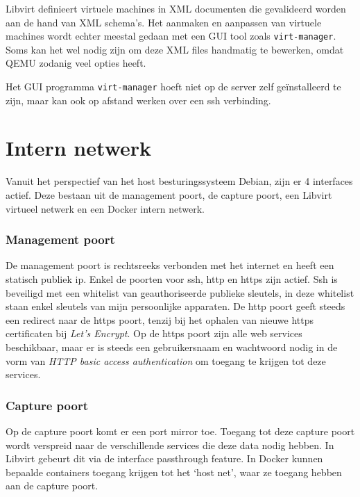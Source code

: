 \documentclass[a4paper,12pt]{report}
\begin{document}
Libvirt definieert virtuele machines in XML documenten die gevalideerd worden aan de hand van XML schema's.
Het aanmaken en aanpassen van virtuele machines wordt echter meestal gedaan met een GUI tool zoals \lstinline|virt-manager|.
Soms kan het wel nodig zijn om deze XML files handmatig te bewerken, omdat QEMU zodanig veel opties heeft.
\autocite{libvirt:docs}

Het GUI programma \lstinline|virt-manager| hoeft niet op de server zelf geïnstalleerd te zijn, maar kan ook op afstand werken over een ssh verbinding.


\section{Intern netwerk}
Vanuit het perspectief van het host besturingssysteem Debian, zijn er 4 interfaces actief.
Deze bestaan uit de management poort, de capture poort, een Libvirt virtueel netwerk en een Docker intern netwerk.

\subsubsection{Management poort}
De management poort is rechtsreeks verbonden met het internet en heeft een statisch publiek ip.
Enkel de poorten voor ssh, http en https zijn actief.
Ssh is beveiligd met een whitelist van geauthoriseerde publieke sleutels, in deze whitelist staan enkel sleutels van mijn persoonlijke apparaten.
De http poort geeft steeds een redirect naar de https poort, tenzij bij het ophalen van nieuwe https certificaten bij \emph{Let's Encrypt}.
Op de https poort zijn alle web services beschikbaar, maar er is steeds een gebruikersnaam en wachtwoord nodig in de vorm van \emph{HTTP basic access authentication} om toegang te krijgen tot deze services.

\subsubsection{Capture poort}
Op de capture poort komt er een port mirror toe.
Toegang tot deze capture poort wordt verspreid naar de verschillende services die deze data nodig hebben.
In Libvirt gebeurt dit via de interface passthrough feature.
In Docker kunnen bepaalde containers toegang krijgen tot het `host net', waar ze toegang hebben aan de capture poort.
\end{document}
